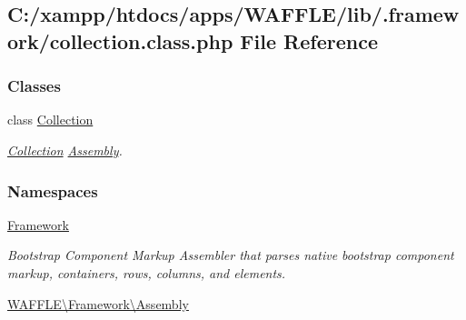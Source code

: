 \hypertarget{collection_8class_8php}{}\subsection{C\+:/xampp/htdocs/apps/\+W\+A\+F\+F\+L\+E/lib/.framework/collection.class.\+php File Reference}
\label{collection_8class_8php}
\subsubsection*{Classes}
\begin{DoxyCompactItemize}
\item 
class \hyperlink{class_w_a_f_f_l_e_1_1_framework_1_1_assembly_1_1_collection}{Collection}
\begin{DoxyCompactList}\small\item\em \hyperlink{class_w_a_f_f_l_e_1_1_framework_1_1_assembly_1_1_collection}{Collection} \hyperlink{namespace_w_a_f_f_l_e_1_1_framework_1_1_assembly}{Assembly}. \end{DoxyCompactList}\end{DoxyCompactItemize}
\subsubsection*{Namespaces}
\begin{DoxyCompactItemize}
\item 
 \hyperlink{namespace_framework}{Framework}
\begin{DoxyCompactList}\small\item\em Bootstrap Component Markup Assembler that parses native bootstrap component markup, containers, rows, columns, and elements. \end{DoxyCompactList}\item 
 \hyperlink{namespace_w_a_f_f_l_e_1_1_framework_1_1_assembly}{W\+A\+F\+F\+L\+E\textbackslash{}\+Framework\textbackslash{}\+Assembly}
\end{DoxyCompactItemize}
